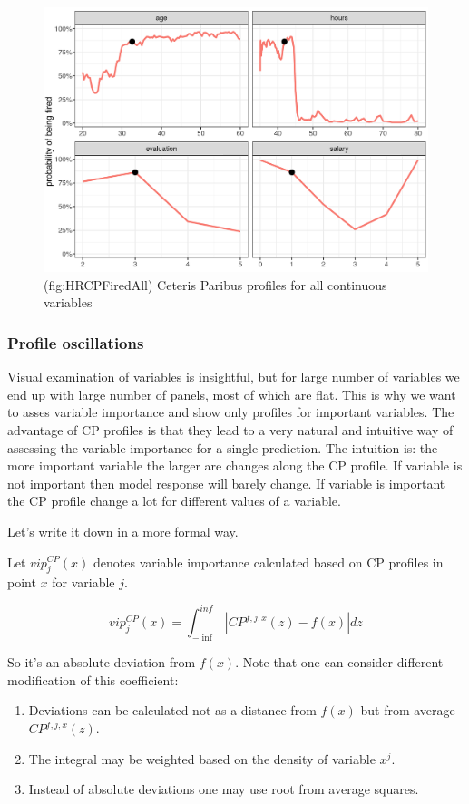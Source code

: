 \documentclass[]{krantz}
\providecommand{\tightlist}{%
  \setlength{\itemsep}{0pt}\setlength{\parskip}{0pt}}
\theoremstyle{definition}
\theoremstyle{definition}
\theoremstyle{definition}
\theoremstyle{remark}
\begin{document}
\begin{figure}

{\centering \includegraphics[width=0.7\linewidth]{figure/HR_cp_fired_all} 

}

\caption{(fig:HRCPFiredAll) Ceteris Paribus profiles for all continuous variables}\label{fig:HRCPFiredAll}
\end{figure}

\hypertarget{oscillations}{%
\subsubsection{Profile oscillations}\label{oscillations}}

Visual examination of variables is insightful, but for large number of
variables we end up with large number of panels, most of which are flat.
This is why we want to asses variable importance and show only profiles
for important variables. The advantage of CP profiles is that they lead
to a very natural and intuitive way of assessing the variable importance
for a single prediction. The intuition is: the more important variable
the larger are changes along the CP profile. If variable is not
important then model response will barely change. If variable is
important the CP profile change a lot for different values of a
variable.

Let's write it down in a more formal way.

Let \(vip^{CP}_j(x)\) denotes variable importance calculated based on CP
profiles in point \(x\) for variable \(j\).

\[
vip^{CP}_j(x) = \int_{-\inf}^{inf} |CP^{f,j,x}(z) - f(x)| dz
\]

So it's an absolute deviation from \(f(x)\). Note that one can consider
different modification of this coefficient:

\begin{enumerate}
\def\labelenumi{\arabic{enumi}.}
\tightlist
\item
  Deviations can be calculated not as a distance from \(f(x)\) but from
  average \(\bar CP^{f,j,x}(z)\).
\item
  The integral may be weighted based on the density of variable \(x^j\).
\item
  Instead of absolute deviations one may use root from average squares.
\end{enumerate}
\end{document}
